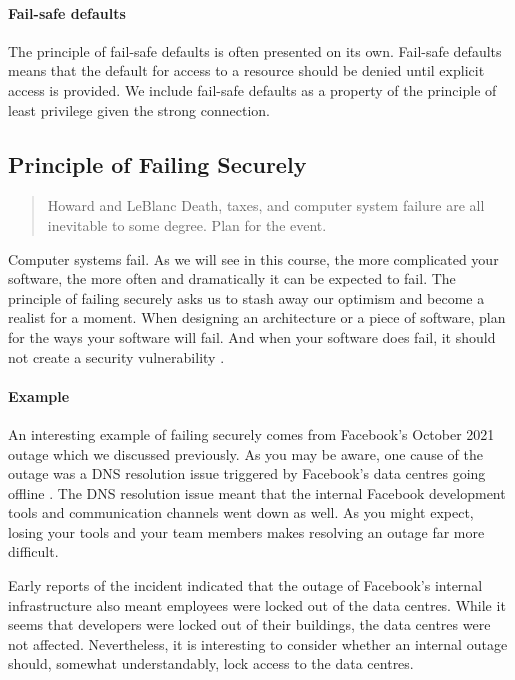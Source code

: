 \paragraph{Fail-safe defaults}
The principle of fail-safe defaults is often presented on its own.
Fail-safe defaults means that the default for access to a resource should be denied until explicit access is provided.
We include fail-safe defaults as a property of the principle of least privilege given the strong connection.

\subsection{Principle of Failing Securely}

\begin{quote}{Howard and LeBlanc \cite{death-taxes-and-failure}}
Death, taxes, and computer system failure are all inevitable to some degree. Plan for the event.
\end{quote}

\noindent Computer systems fail.
As we will see in this course, the more complicated your software, the more often and dramatically it can be expected to fail.
The principle of failing securely asks us to stash away our optimism and become a realist for a moment.
When designing an architecture or a piece of software, plan for the ways your software will fail.
And when your software does fail, it should not create a security vulnerability \cite{failing-securely}.

\paragraph{Example}
An interesting example of failing securely comes from Facebook's October 2021 outage which we discussed previously.
As you may be aware, one cause of the outage was a DNS resolution issue triggered by Facebook's data centres going offline \cite{facebook-outage}.
The DNS resolution issue meant that the internal Facebook development tools and communication channels went down as well.
As you might expect, losing your tools and your team members makes resolving an outage far more difficult.

Early reports of the incident indicated that the outage of Facebook's internal infrastructure also meant employees were locked out of the data centres.
While it seems that developers were locked out of their buildings, the data centres were not affected.
Nevertheless, it is interesting to consider whether an internal outage should, somewhat understandably, lock access to the data centres.

